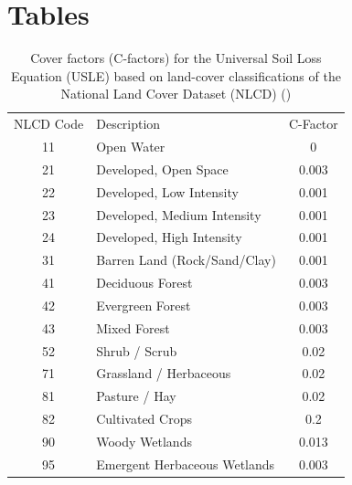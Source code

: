 \documentclass{article}
\begin{document}
\section*{Tables}
	\begin{table}[h]
		\centering
		\begin{tabular}{clc}
			\hline
			NLCD Code & Description & C-Factor\\
			\cline{2-3}
			11 & Open Water & 0 \\
			21 & Developed, Open Space & 0.003 \\
			22 & Developed, Low Intensity & 0.001 \\
			23 & Developed, Medium Intensity & 0.001 \\
			24 & Developed, High Intensity & 0.001 \\
			31 & Barren Land (Rock/Sand/Clay) & 0.001 \\
			41 & Deciduous Forest & 0.003 \\
			42 & Evergreen Forest & 0.003 \\
			43 & Mixed Forest & 0.003 \\
			52 & Shrub / Scrub & 0.02 \\
			71 & Grassland / Herbaceous & 0.02 \\
			81 & Pasture / Hay & 0.02 \\
			82 & Cultivated Crops & 0.2 \\
			90 & Woody Wetlands & 0.013 \\
			95 & Emergent Herbaceous Wetlands & 0.003 \\
			\hline
		\end{tabular}
		\caption[Cover factors (C-factors) for the Universal Soil Loss Equation (USLE)]{Cover factors (C-factors) for the Universal Soil Loss Equation (USLE) based on land-cover classifications of the National Land Cover Dataset (NLCD) (\cite{montana_deq_draft_2012})}
		\label{table:cFactorTable}
	\end{table}
\end{document}
